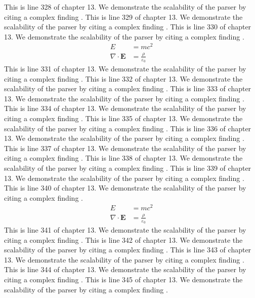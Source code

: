 This is line 328 of chapter 13. We demonstrate the scalability of the parser by citing a complex finding \cite{ref13_328}.
This is line 329 of chapter 13. We demonstrate the scalability of the parser by citing a complex finding \cite{ref13_329}.
This is line 330 of chapter 13. We demonstrate the scalability of the parser by citing a complex finding \cite{ref13_330}.
\begin{align*}
  E &= mc^2 \\
  \nabla \cdot \mathbf{E} &= \frac{\rho}{\varepsilon_0}
\end{align*}
This is line 331 of chapter 13. We demonstrate the scalability of the parser by citing a complex finding \cite{ref13_331}.
This is line 332 of chapter 13. We demonstrate the scalability of the parser by citing a complex finding \cite{ref13_332}.
This is line 333 of chapter 13. We demonstrate the scalability of the parser by citing a complex finding \cite{ref13_333}.
This is line 334 of chapter 13. We demonstrate the scalability of the parser by citing a complex finding \cite{ref13_334}.
This is line 335 of chapter 13. We demonstrate the scalability of the parser by citing a complex finding \cite{ref13_335}.
This is line 336 of chapter 13. We demonstrate the scalability of the parser by citing a complex finding \cite{ref13_336}.
This is line 337 of chapter 13. We demonstrate the scalability of the parser by citing a complex finding \cite{ref13_337}.
This is line 338 of chapter 13. We demonstrate the scalability of the parser by citing a complex finding \cite{ref13_338}.
This is line 339 of chapter 13. We demonstrate the scalability of the parser by citing a complex finding \cite{ref13_339}.
This is line 340 of chapter 13. We demonstrate the scalability of the parser by citing a complex finding \cite{ref13_340}.
\begin{align*}
  E &= mc^2 \\
  \nabla \cdot \mathbf{E} &= \frac{\rho}{\varepsilon_0}
\end{align*}
This is line 341 of chapter 13. We demonstrate the scalability of the parser by citing a complex finding \cite{ref13_341}.
This is line 342 of chapter 13. We demonstrate the scalability of the parser by citing a complex finding \cite{ref13_342}.
This is line 343 of chapter 13. We demonstrate the scalability of the parser by citing a complex finding \cite{ref13_343}.
This is line 344 of chapter 13. We demonstrate the scalability of the parser by citing a complex finding \cite{ref13_344}.
This is line 345 of chapter 13. We demonstrate the scalability of the parser by citing a complex finding \cite{ref13_345}.
